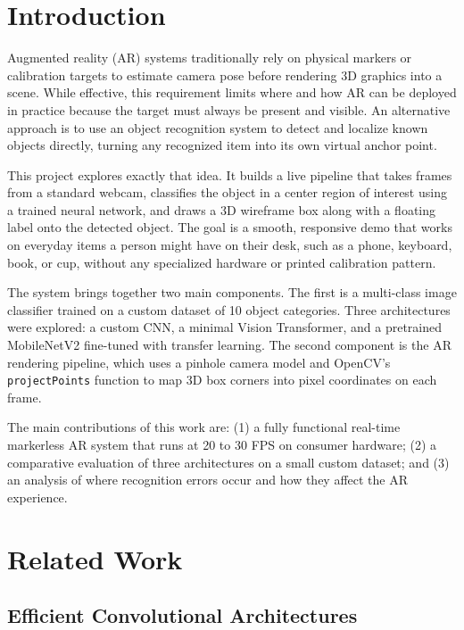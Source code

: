 \documentclass[conference]{IEEEtran}
\begin{document}
\section{Introduction}

Augmented reality (AR) systems traditionally rely on physical markers or
calibration targets to estimate camera pose before rendering 3D graphics into
a scene. While effective, this requirement limits where and how AR can be
deployed in practice because the target must always be present and visible.
An alternative approach is to use an object recognition system to detect and
localize known objects directly, turning any recognized item into its own
virtual anchor point.

This project explores exactly that idea. It builds a live pipeline that takes
frames from a standard webcam, classifies the object in a center region of
interest using a trained neural network, and draws a 3D wireframe box along
with a floating label onto the detected object. The goal is a smooth,
responsive demo that works on everyday items a person might have on their desk,
such as a phone, keyboard, book, or cup, without any specialized hardware or
printed calibration pattern.

The system brings together two main components. The first is a multi-class
image classifier trained on a custom dataset of 10 object categories. Three
architectures were explored: a custom CNN, a minimal Vision Transformer, and
a pretrained MobileNetV2 fine-tuned with transfer learning. The second
component is the AR rendering pipeline, which uses a pinhole camera model and
OpenCV's \texttt{projectPoints} function to map 3D box corners into pixel
coordinates on each frame.

The main contributions of this work are: (1) a fully functional real-time
markerless AR system that runs at 20 to 30 FPS on consumer hardware; (2) a
comparative evaluation of three architectures on a small custom dataset;
and (3) an analysis of where recognition errors occur and how they affect
the AR experience.

\section{Related Work}

\subsection{Efficient Convolutional Architectures}
\end{document}
